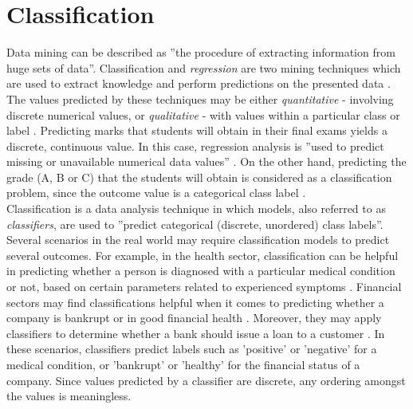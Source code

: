 \chapter[Classification]{Classification}
\label{ch:classification}

Data mining can be described as ''the procedure of extracting information from huge sets of data''. Classification and \textit{regression} are two mining techniques which are used to extract knowledge and perform predictions on the presented data \citep{sagar2017}. The values predicted by these techniques may be either \textit{quantitative} - involving discrete numerical values, or \textit{qualitative} - with values within a particular class or label \citep{james2006}. Predicting marks that students will obtain in their final exams yields a discrete, continuous value. In this case, regression analysis is ''used to predict missing or unavailable numerical data values'' \citep{jiawei2011}. On the other hand, predicting the grade (A, B or C) that the students will obtain is considered as a classification problem, since the outcome value is a categorical class label \citep{jiawei2011}. \\

Classification is a data analysis technique in which models, also referred to as \textit{classifiers}, are used to ''predict categorical (discrete, unordered) class labels''. Several scenarios in the real world may require classification models to predict several outcomes. For example, in the health sector, classification can be helpful in predicting whether a person is diagnosed with a particular medical condition or not, based on certain parameters related to experienced symptoms \citep{venkata2011,alzahani2015}. Financial sectors may find classifications helpful when it comes to predicting whether a company is bankrupt or in good financial health \citep{moradi2012}. Moreover, they may apply classifiers to determine whether a bank should issue a loan to a customer \citep{thomas2000}. In these scenarios, classifiers predict labels such as 'positive' or 'negative' for a medical condition, or 'bankrupt' or 'healthy' for the financial status of a company. Since values predicted by a classifier are discrete, any ordering amongst the values is meaningless. 


